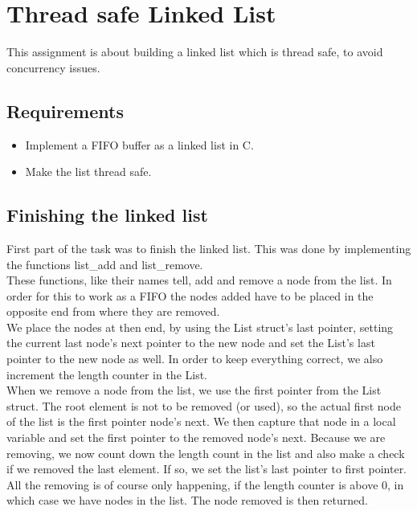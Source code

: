 \chapter{Thread safe Linked List}
This assignment is about building a linked list which is thread safe, to avoid concurrency issues.

\section{Requirements}
\begin{itemize}
\item Implement a FIFO buffer as a linked list in C.
\item Make the list thread safe.
\end{itemize}

\section{Finishing the linked list}
First part of the task was to finish the linked list. This was done by implementing the functions list\_add and list\_remove.\\

These functions, like their names tell, add and remove a node from the list. In order for this to work as a FIFO the nodes added have to be placed in the opposite end from where they are removed.\\

We place the nodes at then end, by using the List struct's last pointer, setting the current last node's next pointer to the new node and set the List's last pointer to the new node as well. In order to keep everything correct, we also increment the length counter in the List.\\

When we remove a node from the list, we use the first pointer from the List struct. The root element is not to be removed (or used), so the actual first node of the list is the first pointer node's next. We then capture that node in a local variable and set the first pointer to the removed node's next. Because we are removing, we now count down the length count in the list and also make a check if we removed the last element. If so, we set the list's last pointer to first pointer.\\

All the removing is of course only happening, if the length counter is above 0, in which case we have nodes in the list. The node removed is then returned.


